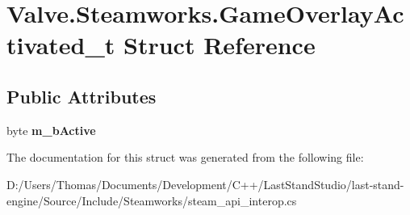\hypertarget{structValve_1_1Steamworks_1_1GameOverlayActivated__t}{}\section{Valve.\+Steamworks.\+Game\+Overlay\+Activated\+\_\+t Struct Reference}
\label{structValve_1_1Steamworks_1_1GameOverlayActivated__t}
\subsection*{Public Attributes}
\begin{DoxyCompactItemize}
\item 
\hypertarget{structValve_1_1Steamworks_1_1GameOverlayActivated__t_a3195e6cec112fbd5b2a5cbd63cbab635}{}byte {\bfseries m\+\_\+b\+Active}\label{structValve_1_1Steamworks_1_1GameOverlayActivated__t_a3195e6cec112fbd5b2a5cbd63cbab635}

\end{DoxyCompactItemize}


The documentation for this struct was generated from the following file\+:\begin{DoxyCompactItemize}
\item 
D\+:/\+Users/\+Thomas/\+Documents/\+Development/\+C++/\+Last\+Stand\+Studio/last-\/stand-\/engine/\+Source/\+Include/\+Steamworks/steam\+\_\+api\+\_\+interop.\+cs\end{DoxyCompactItemize}
